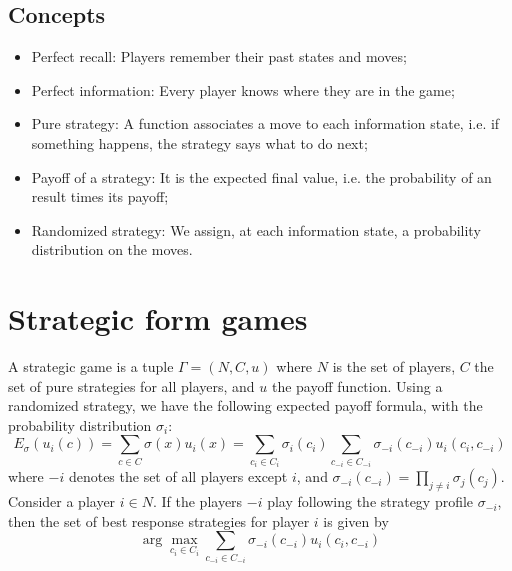 \documentclass[12pt, openany]{report}
\theoremstyle{definition}
\begin{document}
\subsection{Concepts}
\begin{itemize}
	\item Perfect recall: Players remember their past states and moves;
	\item Perfect information: Every player knows where they are in the game;
	\item Pure strategy: A function associates a move to each information state, i.e. if something happens, the strategy says what to do next;
	\item Payoff of a strategy: It is the expected final value, i.e. the probability of an result times its payoff;
	\item Randomized strategy: We assign, at each information state, a probability distribution on the moves.
\end{itemize}
\section{Strategic form games}
A strategic game is a tuple $\Gamma=(N,C,u)$ where $N$ is the set of players, $C$ the set of pure strategies for all players, and $u$ the payoff function. Using a randomized strategy, we have the following expected payoff formula, with the probability distribution $\sigma_i$:
\begin{equation}
	E_\sigma (u_i(c)) = \sum_{c\in C}\sigma(x)u_i(x) = \sum_{c_i\in C_i} \sigma_i(c_i)\sum_{c_{-i}\in C_{-i}}\sigma_{-i}(c_{-i})u_i(c_i,c_{-i})
\end{equation}
where $-i$ denotes the set of all players except $i$, and $\sigma_{-i}(c_{-i}) =\prod_{j\neq i}\sigma_j(c_j)$.\\
Consider a player $i\in N$. If the players $-i$ play following the strategy profile $\sigma_{-i}$, then the set of best response strategies for player $i$ is given by 
\begin{equation}
	\arg\max_{c_i\in C_i} \sum_{c_{-i}\in C_{-i}}\sigma_{-i}(c_{-i})u_i(c_i,c_{-i})
\end{equation}
\end{document}
